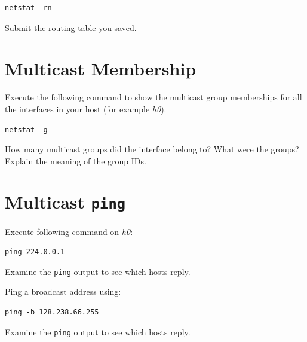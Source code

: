 \documentclass{../UTNetLab}
\begin{document}
\begin{lstlisting}
netstat -rn
    \end{lstlisting}

\begin{report}
    \item Submit the routing table you saved.
\end{report}

\section{Multicast Membership}
Execute the following command to show the multicast group memberships for all the interfaces in your host (for example \textit{h0}).

\begin{lstlisting}
netstat -g
    \end{lstlisting}

\begin{report}
    \item How many multicast groups did the interface belong to? What were the groups? Explain the meaning of the group IDs.
\end{report}

\section{Multicast \texttt{ping}}

Execute following command on \textit{h0}:

\begin{lstlisting}
ping 224.0.0.1
    \end{lstlisting}
Examine the \lstinline{ping} output to see which hosts reply.

Ping a broadcast address using:

\begin{lstlisting}
ping -b 128.238.66.255
    \end{lstlisting}
Examine the \lstinline{ping} output to see which hosts reply.
\end{document}
